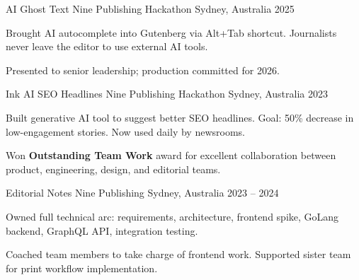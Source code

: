 

\begin{cventries}

  \cventry
    {AI Ghost Text} %
    {Nine Publishing Hackathon} %
    {Sydney, Australia} %
    {2025} %
    {
      \begin{cvitems}
        \item {Brought AI autocomplete into Gutenberg via Alt+Tab shortcut. Journalists never leave the editor to use external AI tools.}
        \item {Presented to senior leadership; production committed for 2026.}
      \end{cvitems}
    }

  \cventry
    {Ink AI SEO Headlines} %
    {Nine Publishing Hackathon} %
    {Sydney, Australia} %
    {2023} %
    {
      \begin{cvitems}
        \item {Built generative AI tool to suggest better SEO headlines. Goal: 50\% decrease in low-engagement stories. Now used daily by newsrooms.}
        \item {Won \textbf{Outstanding Team Work} award for excellent collaboration between product, engineering, design, and editorial teams.}
      \end{cvitems}
    }

  \cventry
    {Editorial Notes} %
    {Nine Publishing} %
    {Sydney, Australia} %
    {2023 -- 2024} %
    {
      \begin{cvitems}
        \item {Owned full technical arc: requirements, architecture, frontend spike, GoLang backend, GraphQL API, integration testing.}
        \item {Coached team members to take charge of frontend work. Supported sister team for print workflow implementation.}
      \end{cvitems}
    }

\end{cventries}

\pagebreak
